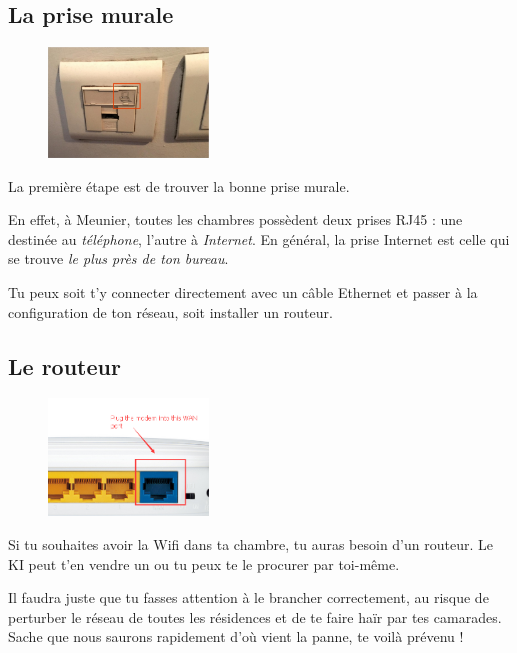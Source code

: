 \documentclass{../templates/enpc-ki/ki019}
\begin{document}
  \newpage
    \Header{}


    \tableofcontents

  \newpage

    \subsection{La prise murale}
    \begin{figure}
      \centering
      \includegraphics[width=0.38\textwidth]{page6}
    \end{figure}
    La première étape est de trouver la bonne prise murale.

    En effet, à Meunier, toutes les chambres possèdent deux prises RJ45 : une destinée au \emph{téléphone}, l'autre à \emph{Internet}. En général, la prise Internet est celle qui se trouve \emph{le plus près de ton bureau}.

    Tu peux soit t’y connecter directement avec un câble Ethernet et passer à la configuration de ton réseau, soit installer un routeur. %


\bigskip
    \subsection{Le routeur}
    \begin{figure}
      \centering
      \includegraphics[width=0.38\textwidth]{page7}
    \end{figure}
    Si tu souhaites avoir la Wifi dans ta chambre, tu auras besoin d’un routeur. Le KI peut t'en vendre un ou tu peux te le procurer par toi-même.


    Il faudra juste que tu fasses attention à le brancher correctement, au risque de perturber le réseau de toutes les résidences et de te faire haïr par tes camarades. Sache que nous saurons rapidement d’où vient la panne, te voilà prévenu !
\end{document}
